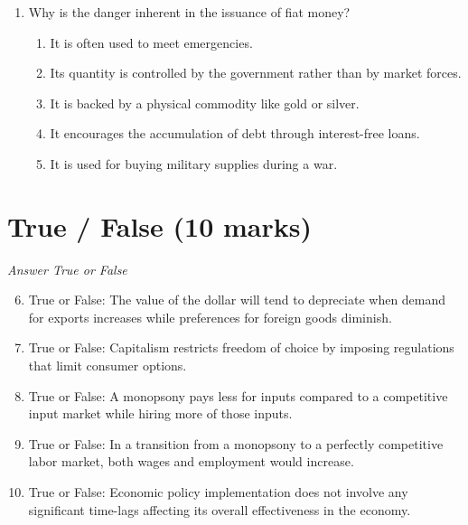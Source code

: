 \documentclass[12pt]{article}
\begin{document}
\begin{enumerate}[label=\arabic*.]
\begin{enumerate}[label=(\alph*)]
    \item The price of the land is entirely made up of transfer earnings.
    \item Economic rent remains constant while transfer earnings fluctuate with market demands.
    \item Transfer earnings are zero and the price of the land is entirely made up of economic rent.
    \item Both transfer earnings and economic rent increase proportionally.
    \item Transfer earnings and economic rent vary inversely; as one increases, the other decreases.
\end{enumerate}
\item Why is the danger inherent in the issuance of fiat money?
\begin{enumerate}[label=(\alph*)]
    \item It is often used to meet emergencies.
    \item Its quantity is controlled by the government rather than by market forces.
    \item It is backed by a physical commodity like gold or silver.
    \item It encourages the accumulation of debt through interest-free loans.
    \item It is used for buying military supplies during a war.
\end{enumerate}
\end{enumerate}

\section*{True / False (10 marks)}
\textit{Answer True or False}
\begin{enumerate}[label=\arabic*.]
\setcounter{enumi}{5}
\item True or False: The value of the dollar will tend to depreciate when demand for exports increases while preferences for foreign goods diminish.
\item True or False: Capitalism restricts freedom of choice by imposing regulations that limit consumer options.
\item True or False: A monopsony pays less for inputs compared to a competitive input market while hiring more of those inputs.
\item True or False: In a transition from a monopsony to a perfectly competitive labor market, both wages and employment would increase.
\item True or False: Economic policy implementation does not involve any significant time-lags affecting its overall effectiveness in the economy.
\end{enumerate}
\end{document}
